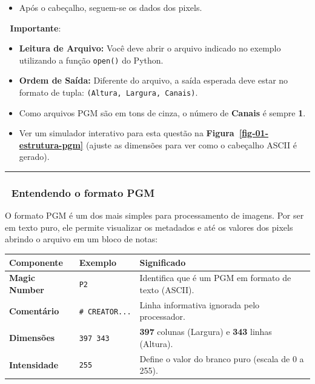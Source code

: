 \documentclass[
  portuguese,
  letterpaper,
  openany,
  oneside,
  12pt,
  a4paper]{book}
\providecommand{\tightlist}{%
  \setlength{\itemsep}{0pt}\setlength{\parskip}{0pt}}
\begin{document}
\begin{itemize}
\tightlist
\item
  Após o cabeçalho, seguem-se os dados dos pixels.
\end{itemize}

📌 \textbf{Importante}:

\begin{itemize}
\tightlist
\item
  \textbf{Leitura de Arquivo:} Você deve abrir o arquivo indicado no
  exemplo utilizando a função \texttt{open()} do Python.
\item
  \textbf{Ordem de Saída:} Diferente do arquivo, a saída esperada deve
  estar no formato de tupla: \texttt{(Altura,\ Largura,\ Canais)}.
\item
  Como arquivos PGM são em tons de cinza, o número de \textbf{Canais} é
  sempre \textbf{1}.
\item
  Ver um simulador interativo para esta questão na
  \textbf{Figura~\ref{fig-01-estrutura-pgm}} (ajuste as dimensões para
  ver como o cabeçalho ASCII é gerado).
\end{itemize}

\begin{center}\rule{0.5\linewidth}{0.5pt}\end{center}

\subsubsection{🧠 Entendendo o formato
PGM}\label{entendendo-o-formato-pgm}

O formato PGM é um dos mais simples para processamento de imagens. Por
ser em texto puro, ele permite visualizar os metadados e até os valores
dos pixels abrindo o arquivo em um bloco de notas:

\begin{longtable}[]{@{}
  >{\raggedright\arraybackslash}p{}
  >{\raggedright\arraybackslash}p{}
  >{\raggedright\arraybackslash}p{}@{}}
\toprule\noalign{}
\begin{minipage}[b]{\linewidth}\raggedright
Componente
\end{minipage} & \begin{minipage}[b]{\linewidth}\raggedright
Exemplo
\end{minipage} & \begin{minipage}[b]{\linewidth}\raggedright
Significado
\end{minipage} \\
\midrule\noalign{}
\endhead
\bottomrule\noalign{}
\endlastfoot
\textbf{Magic Number} & \texttt{P2} & Identifica que é um PGM em formato
de texto (ASCII). \\
\textbf{Comentário} & \texttt{\#\ CREATOR...} & Linha informativa
ignorada pelo processador. \\
\textbf{Dimensões} & \texttt{397\ 343} & \textbf{397} colunas (Largura)
e \textbf{343} linhas (Altura). \\
\textbf{Intensidade} & \texttt{255} & Define o valor do branco puro
(escala de 0 a 255). \\
\end{longtable}
\end{document}
